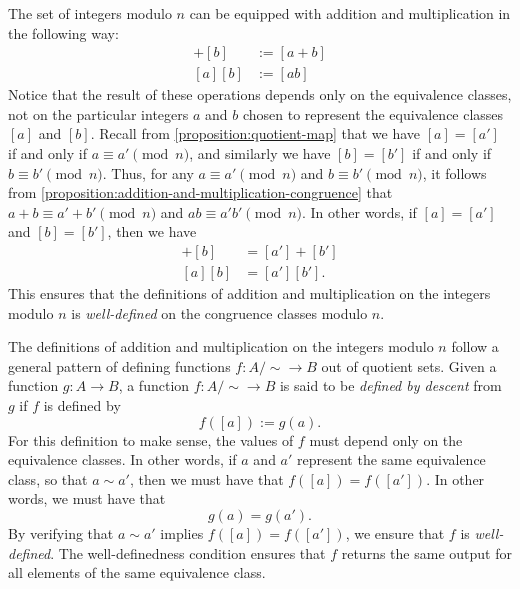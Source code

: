 The set of integers modulo $n$ can be equipped with addition and multiplication in the following way:
\begin{align*}
  [a] + [b] & := [a+b] \\
  [a][b] & := [ab]
\end{align*}
Notice that the result of these operations depends only on the equivalence classes, not on the particular integers $a$ and $b$ chosen to represent the equivalence classes $[a]$ and $[b]$. Recall from \cref{proposition:quotient-map} that we have $[a]=[a']$ if and only if $a\equiv a'\pmod{n}$, and similarly we have $[b]=[b']$ if and only if $b\equiv b'\pmod{n}$. Thus, for any $a\equiv a'\pmod{n}$ and $b\equiv b'\pmod{n}$, it follows from \cref{proposition:addition-and-multiplication-congruence} that $a+b\equiv a'+b'\pmod{n}$ and $ab\equiv a'b'\pmod{n}$. In other words, if $[a]=[a']$ and $[b]=[b']$, then we have
\begin{align*}
  [a]+[b] & = [a']+[b'] \\
  [a][b] & = [a'][b'].
\end{align*}
This ensures that the definitions of addition and multiplication on the integers modulo $n$ is \emph{well-defined} on the congruence classes modulo $n$.

\begin{remark}
  The definitions of addition and multiplication on the integers modulo $n$ follow a general pattern of defining functions $f:A/{\sim}\to B$ out of quotient sets. Given a function $g:A\to B$, a function $f:A/{\sim}\to B$ is said to be \emph{defined by descent} from $g$ if $f$ is defined by
  \begin{equation*}
    f([a]) := g(a).
  \end{equation*}
  For this definition to make sense, the values of $f$ must depend only on the equivalence classes. In other words, if $a$ and $a'$ represent the same equivalence class, so that $a\sim a'$, then we must have that $f([a])=f([a'])$. In other words, we must have that
  \begin{equation*}
    g(a)=g(a').
  \end{equation*}
  By verifying that $a\sim a'$ implies $f([a])=f([a'])$, we ensure that $f$ is \emph{well-defined}. The well-definedness condition ensures that $f$ returns the same output for all elements of the same equivalence class.
\end{remark}

